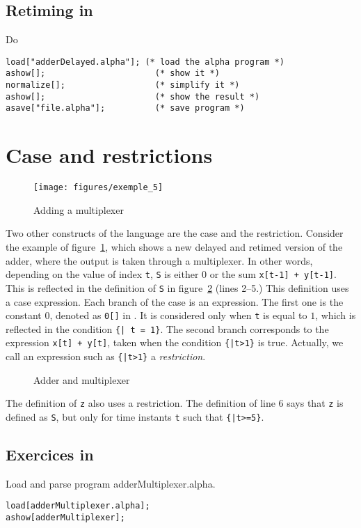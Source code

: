\subsection*{Retiming in {\mmalfa}}
Do 
\begin{verbatim}
load["adderDelayed.alpha"]; (* load the alpha program *)
ashow[];                      (* show it *)
normalize[];                  (* simplify it *)
ashow[];                      (* show the result *)
asave["file.alpha"];          (* save program *)
\end{verbatim}

%
\section{Case and restrictions}
\begin{figure}[htbp]
\centerline{\texttt{[image: figures/exemple\_5]}}
\caption{Adding a multiplexer}\label{adderMultiplexer}
\end{figure}

Two other constructs of the language are the case and the
restriction.  Consider the example of figure~\ref{adderMultiplexer},
which shows a new delayed and retimed version of the adder, where the
output is taken through a multiplexer. In other
words, depending on the value of index {\tt t}, {\tt S} is either 0 or
the sum {\tt x[t-1] + y[t-1]}. This is reflected in the definition of
{\tt S} in figure~\ref{addermultiplexer-alpha} (lines 2--5.) This
definition uses a case expression. Each branch of the case is an {\alfa} expression. The first one is
the constant $0$, denoted as {\tt 0[]} in {\alfa}. It is
considered only when {\tt t} is equal to $1$, which is reflected in the
condition {\tt \{| t = 1\}}. The second branch
corresponds to the expression {\tt x[t] + y[t]}, taken when the
condition {\tt \{|t>1\}} is true. Actually, we call an expression such
as {\tt \{|t>1\}} a {\em restriction}.

\begin{figure}[htbp]

\caption{Adder and multiplexer}\label{addermultiplexer-alpha}
\end{figure}
The definition of {\tt z} also uses a restriction. The definition of 
line 6 says that {\tt z} is defined as {\tt S}, but only for time 
instants {\tt t} such that {\tt \{|t>=5\}}. 
\subsection*{Exercices in {\mma}}
Load and parse program adderMultiplexer.alpha.
\begin{verbatim}
load[adderMultiplexer.alpha];
ashow[adderMultiplexer];
\end{verbatim}


